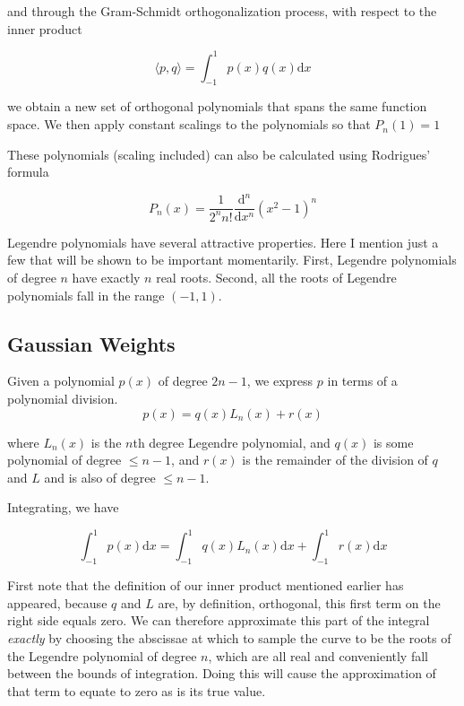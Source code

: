and through the Gram-Schmidt orthogonalization process, with respect to the inner product

\begin{equation} \langle p,q \rangle = \int^1_{-1} p(x) q(x) \mathrm{d}x \end{equation}

we obtain a new set of orthogonal polynomials that spans the same function space. We then apply constant scalings to the polynomials so that \(P_n(1) = 1\)

These polynomials (scaling included) can also be calculated using Rodrigues' formula

\begin{equation}  P_n(x) = \frac{1}{2^n n!} \frac{\mathrm{d}^n}{\mathrm{d}x^n} \left(x^2 - 1 \right) ^n  \end{equation}

Legendre polynomials have several attractive properties. Here I mention just a few that will be shown to be important momentarily.  First, Legendre polynomials of degree $n$ have exactly $n$ real roots. Second, all the roots of Legendre polynomials fall in the range $(-1,1)$.

\subsection{Gaussian Weights}

Given a polynomial $p(x)$ of degree $2n-1$, we express $p$ in terms of a polynomial division.
\begin{equation} p(x) = q(x) L_n(x) + r(x) \end{equation}

where $L_n(x)$ is the $n$th degree Legendre polynomial, and $q(x)$ is some polynomial of degree $\leq n-1$, and $r(x)$ is the remainder of the division of $q$ and $L$ and is also of degree $\leq n-1$.

Integrating, we have

\begin{equation} \int_{-1}^{1} p(x) \mathrm{d}x = \int_{-1}^{1} q(x) L_n(x) \mathrm{d}x + \int_{-1}^{1} r(x) \mathrm{d}x \end{equation}

First note that the definition of our inner product mentioned earlier has appeared, because $q$ and $L$ are, by definition, orthogonal, this first term on the right side equals zero.  We can therefore approximate this part of the integral \textit{exactly} by choosing the abscissae at which to sample the curve to be the roots of the Legendre polynomial of degree $n$, which are all real and conveniently fall between the bounds of integration.  Doing this will cause the approximation of that term to equate to zero as is its true value.

